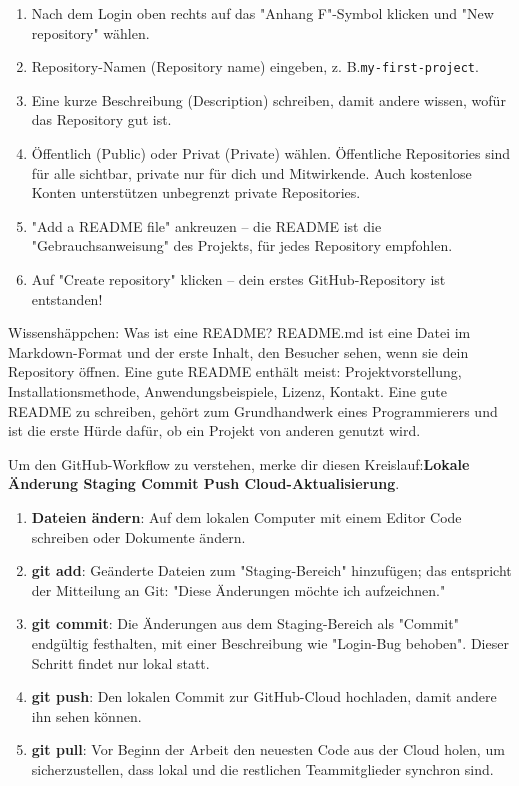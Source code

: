 
\begin{enumerate}
  \item Nach dem Login oben rechts auf das "Anhang F"-Symbol klicken und "New repository" wählen.
  \item Repository-Namen (Repository name) eingeben, z. B.\texttt{my-\allowbreak first-\allowbreak project}.
  \item Eine kurze Beschreibung (Description) schreiben, damit andere wissen, wofür das Repository gut ist.
  \item Öffentlich (Public) oder Privat (Private) wählen. Öffentliche Repositories sind für alle sichtbar, private nur für dich und Mitwirkende. Auch kostenlose Konten unterstützen unbegrenzt private Repositories.
  \item "Add a README file" ankreuzen – die README ist die "Gebrauchsanweisung" des Projekts, für jedes Repository empfohlen.
  \item Auf "Create repository" klicken – dein erstes GitHub-Repository ist entstanden!
\end{enumerate}

\begin{tcbinfo}{Wissenshäppchen: Was ist eine README?}
README.md ist eine Datei im Markdown-Format und der erste Inhalt, den Besucher sehen, wenn sie dein Repository öffnen. Eine gute README enthält meist: Projektvorstellung, Installationsmethode, Anwendungsbeispiele, Lizenz, Kontakt. Eine gute README zu schreiben, gehört zum Grundhandwerk eines Programmierers und ist die erste Hürde dafür, ob ein Projekt von anderen genutzt wird.

\end{tcbinfo}


Um den GitHub-Workflow zu verstehen, merke dir diesen Kreislauf:\textbf{Lokale Änderung Staging Commit Push Cloud-Aktualisierung}.

\begin{enumerate}
  \item \textbf{Dateien ändern}: Auf dem lokalen Computer mit einem Editor Code schreiben oder Dokumente ändern.
  \item \textbf{git add}: Geänderte Dateien zum "Staging-Bereich" hinzufügen; das entspricht der Mitteilung an Git: "Diese Änderungen möchte ich aufzeichnen."
  \item \textbf{git commit}: Die Änderungen aus dem Staging-Bereich als "Commit" endgültig festhalten, mit einer Beschreibung wie "Login-Bug behoben". Dieser Schritt findet nur lokal statt.
  \item \textbf{git push}: Den lokalen Commit zur GitHub-Cloud hochladen, damit andere ihn sehen können.
  \item \textbf{git pull}: Vor Beginn der Arbeit den neuesten Code aus der Cloud holen, um sicherzustellen, dass lokal und die restlichen Teammitglieder synchron sind.
\end{enumerate}

